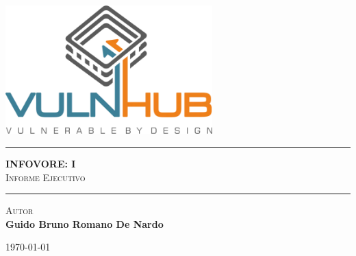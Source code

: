 \begin{titlepage}
    \centering
    \vspace{1cm}
    
    \includegraphics[width=0.6\textwidth]{root/vulnhub.png} \\[2cm]
    
    \rule{\textwidth}{1pt}
    \vspace{0.5cm}
    
    {\Huge \bfseries INFOVORE: I}\\[0.3cm]
    \textsc{Informe Ejecutivo}
    
    \vspace{0.5cm}
    \rule{\textwidth}{1pt}
    
    \vspace{2cm}
    
\vspace{1.5cm}
{\small \textsc{Autor}}\\[0.2cm]
{\small \textbf{Guido Bruno Romano De Nardo}}

\vfill
{\normalsize \today} %
    
\end{titlepage}